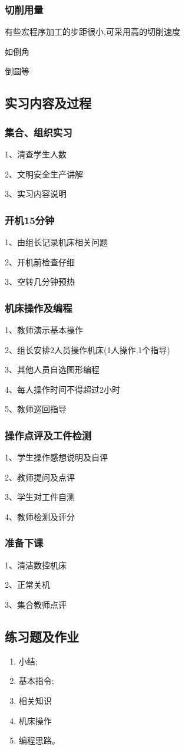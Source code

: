 \subsubsection{切削用量}
有些宏程序加工的步距很小,可采用高的切削速度

如倒角

倒圆等



\subsection{实习内容及过程}

\subsubsection{集合、组织实习}
1、清查学生人数

2、文明安全生产讲解

3、实习内容说明
\subsubsection{开机15分钟}
1、由组长记录机床相关问题

2、开机前检查仔细

3、空转几分钟预热
\subsubsection{机床操作及编程}
1、教师演示基本操作

2、组长安排2人员操作机床(1人操作,1个指导)

3、其他人员自选图形编程

4、每人操作时间不得超过2小时

5、教师巡回指导
\subsubsection{操作点评及工件检测}
1、学生操作感想说明及自评

2、教师提问及点评

3、学生对工件自测

4、教师检测及评分
\subsubsection{准备下课}
1、清洁数控机床

2、正常关机

3、集合教师点评

\subsection{练习题及作业}
\begin{enumerate}[1、]
	\item 小结;
	\item 基本指令;
	\item 相关知识
	\item 机床操作
	\item 编程思路。
\end{enumerate}

